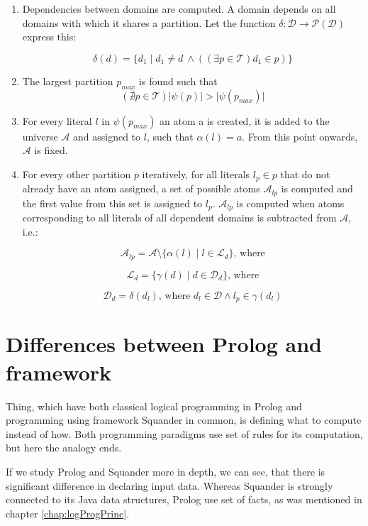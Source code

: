 \documentclass[11pt,twoside,a4paper]{book}
\providecommand{\abs}[1]{\lvert#1\rvert}
\begin{document}
\begin{enumerate}
  \item Dependencies between domains are computed. A domain depends on all
  domains with which it shares a partition. Let the function $\delta :
  \mathcal{D} \rightarrow \mathcal{P}\left(\mathcal{D}\right)$ express this:
  
  $$\delta\left(d\right) = \{d_1 \mid d_1 \neq d\ \wedge
  \left(\left(\exists p \in \mathcal{T}\right)d_1 \in p\right)\} $$
  \item The largest partition $p_{max}$ is found such that
  $$\left(\nexists p\in \mathcal{T}\right) \abs{\psi\left(p\right)} >
  \abs{\psi\left(p_{max}\right)}$$
  \item For every literal $l$ in $\psi\left(p_{max}\right)$ an atom a is
  created, it is added to the universe $\mathcal{A}$ and assigned to $l$, such
  that $\alpha\left(l\right) = a$. From this point onwards, $\mathcal{A}$ is fixed.
  \item For every other partition $p$ iteratively, for all literals $l_p \in p$
  that do not already have an atom assigned, a set of possible atoms
  $\mathcal{A}_{lp}$ is computed and the first value from this set is assigned
  to $l_p$. $\mathcal{A}_{lp}$ is computed when atoms corresponding to all literals of all
  dependent domains is subtracted from $\mathcal{A}$, i.e.:
  \newpage
  
  $$\mathcal{A}_{lp} = \mathcal{A} \setminus \{\alpha\left(l\right)\mid
  l\in\mathcal{L}_d\} \text{, where}$$
  
  $$\mathcal{L}_d = \{\gamma\left(d\right)\mid
  d\in\mathcal{D}_d\} \text{, where}$$
  
  $$\mathcal{D}_d = \delta\left(d_l\right) \text{, where } d_l\in\mathcal{D}
  \wedge l_p \in \gamma\left(d_l\right)$$
\end{enumerate}
\section{Differences between Prolog and framework}

Thing, which have both classical logical programming in Prolog and
programming using framework Squander in common, is defining what to compute
instead of how. Both programming paradigms use set of rules for its computation,
but here the analogy ends.

If we study Prolog and Squander more in depth, we can see, that there is
significant difference in declaring input data. Whereas Squander is strongly
connected to its Java data structures, Prolog use set of facts, as was
mentioned in chapter \ref{chap:logProgPrinc}.
\end{document}
